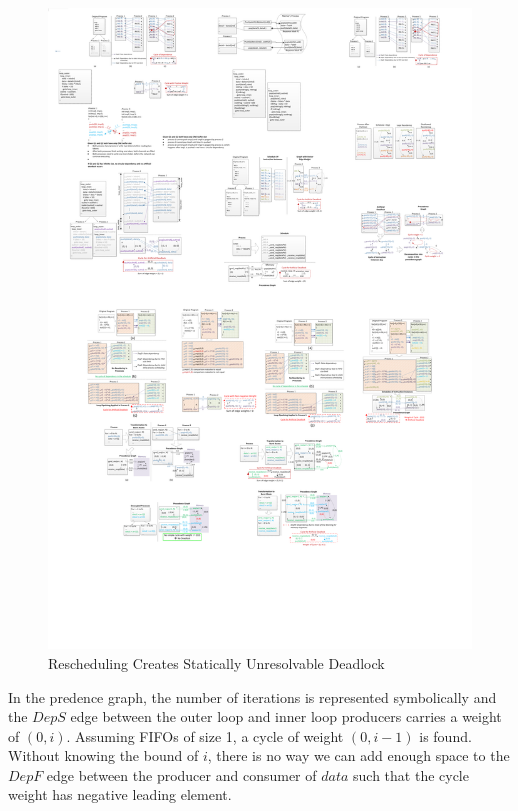 \begin{figure}[htp]
\begin{center}
\includegraphics[width=1.0\linewidth]{chap4fig/unresolve2.pdf}
\caption{Rescheduling Creates Statically Unresolvable Deadlock
\label{fig:badsitu}}
\end{center}
\end{figure}

In the predence graph, the number of iterations is represented
symbolically and the $DepS$ edge between the outer loop and inner loop producers carries a weight of $(0,i)$. Assuming FIFOs of size 1, a cycle of weight $(0, i-1)$ is found. Without knowing the bound of $i$, there is no way we can add enough
space to the $DepF$ edge between the producer and consumer of $data$ such
that the cycle weight has negative leading element.


